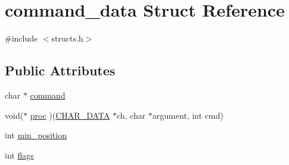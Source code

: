 \hypertarget{structcommand__data}{\section{command\-\_\-data Struct Reference}
\label{structcommand__data}
}


{\ttfamily \#include $<$structs.\-h$>$}

\subsection*{Public Attributes}
\begin{DoxyCompactItemize}
\item 
char $\ast$ \hyperlink{structcommand__data_a7973dbece8d04ab7a146500721efde6f}{command}
\item 
void($\ast$ \hyperlink{structcommand__data_a39db54ac3e5c2e63cde48047b94adc07}{proc} )(\hyperlink{structs_8h_af33ed1e66e8541a08bed257124f50f31}{C\-H\-A\-R\-\_\-\-D\-A\-T\-A} $\ast$ch, char $\ast$argument, int cmd)
\item 
int \hyperlink{structcommand__data_a90ec821dd6eb3eb1740ffd2dacc28fc8}{min\-\_\-position}
\item 
int \hyperlink{structcommand__data_a3737745e9257a92a59402b56340ac250}{flags}
\end{DoxyCompactItemize}


